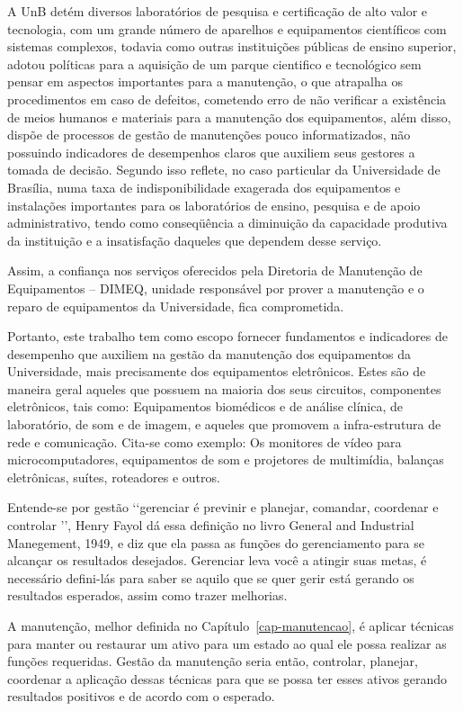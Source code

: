 A UnB detém diversos laboratórios de pesquisa e certificação de alto valor e tecnologia, com um grande número de aparelhos e equipamentos científicos com sistemas complexos, todavia como outras instituições públicas de ensino superior, adotou políticas para a aquisição de um parque cientifico e tecnológico sem pensar em aspectos importantes para a manutenção, o que atrapalha os procedimentos em caso de defeitos, cometendo erro de não verificar a existência de meios humanos e materiais para a manutenção dos equipamentos, além disso, dispõe de processos de gestão de manutenções pouco informatizados, não possuindo indicadores de desempenhos claros que auxiliem seus gestores a tomada de decisão. Segundo \cite{limacastilho2006} isso reflete, no caso particular da Universidade de Brasília, numa taxa de indisponibilidade exagerada dos equipamentos e instalações importantes para os laboratórios de ensino, pesquisa e de apoio administrativo, tendo como conseqüência a diminuição da capacidade produtiva da instituição e a insatisfação daqueles que dependem desse serviço.

Assim, a confiança nos serviços oferecidos pela Diretoria de Manutenção de Equipamentos – DIMEQ, unidade responsável por prover a manutenção e o reparo de equipamentos da Universidade, fica comprometida. 

Portanto, este trabalho tem como escopo fornecer fundamentos e indicadores de desempenho que auxiliem na gestão da manutenção dos equipamentos da Universidade, mais precisamente dos equipamentos eletrônicos. Estes são de maneira geral aqueles que possuem na maioria dos seus circuitos, componentes eletrônicos, tais como: Equipamentos biomédicos e de análise clínica, de laboratório, de som e de imagem, e aqueles que promovem a infra-estrutura de rede e comunicação. Cita-se como exemplo: Os monitores de vídeo para microcomputadores, equipamentos de som e projetores de multimídia, balanças eletrônicas, suítes, roteadores e outros.

Entende-se por gestão \lq\lq gerenciar é previnir e planejar, comandar, coordenar e controlar \rq\rq, Henry Fayol dá essa definição no livro General and Industrial Manegement, 1949, e \cite{prasadgulshan2011} diz que ela passa as funções do gerenciamento para se alcançar os resultados desejados. Gerenciar leva você a atingir suas metas, é necessário defini-lás para saber se aquilo que se quer gerir está gerando os resultados esperados, assim como trazer melhorias.

A manutenção, melhor definida no Capítulo~\ref{cap-manutencao}, é aplicar técnicas para manter ou restaurar um ativo para um estado ao qual ele possa realizar as funções requeridas. Gestão da manutenção seria então, controlar, planejar, coordenar a aplicação dessas técnicas para que se possa ter esses ativos gerando resultados positivos e de acordo com o esperado.

